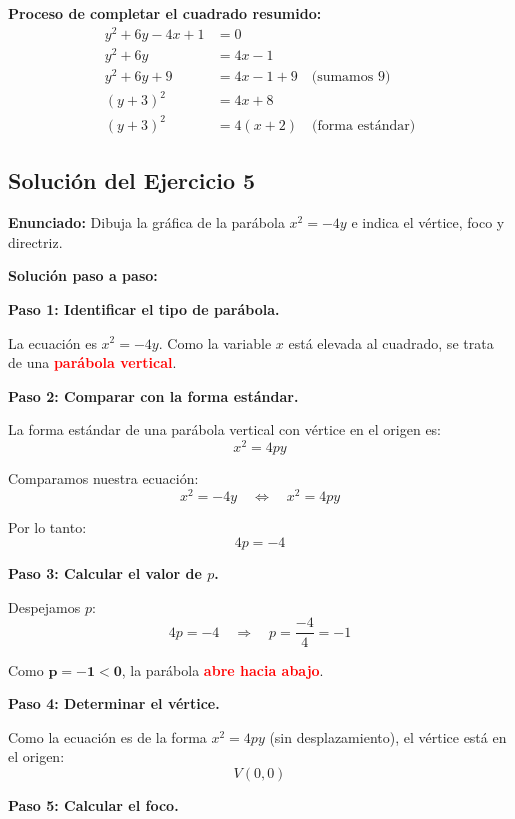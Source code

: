 \documentclass[12pt,a4paper]{article}
\begin{document}
	\bigskip

	\textbf{Proceso de completar el cuadrado resumido:}
	\[
	\begin{aligned}
		y^2+6y-4x+1&=0 \\
		y^2+6y&=4x-1 \\
		y^2+6y+9&=4x-1+9 \quad\text{(sumamos 9)} \\
		(y+3)^2&=4x+8 \\
		(y+3)^2&=4(x+2) \quad\text{(forma estándar)}
	\end{aligned}
	\]


	\subsection*{Solución del Ejercicio 5}

	\textbf{Enunciado:} Dibuja la gráfica de la parábola \(x^2=-4y\) e indica el vértice, foco y directriz.

	\bigskip

	\textbf{Solución paso a paso:}

	\bigskip

	\textbf{Paso 1: Identificar el tipo de parábola.}

	La ecuación es \(x^2=-4y\). Como la variable \(x\) está elevada al cuadrado, se trata de una \textcolor{red}{\textbf{parábola vertical}}.

	\bigskip

	\textbf{Paso 2: Comparar con la forma estándar.}

	La forma estándar de una parábola vertical con vértice en el origen es:
	\[
	x^2=4py
	\]

	Comparamos nuestra ecuación:
	\[
	x^2=-4y \quad\Leftrightarrow\quad x^2=4py
	\]

	Por lo tanto:
	\[
	4p=-4
	\]

	\textbf{Paso 3: Calcular el valor de \(p\).}

	Despejamos \(p\):
	\[
	4p=-4 \quad\Rightarrow\quad p=\frac{-4}{4}=-1
	\]

	Como \(\mathbf{p=-1<0}\), la parábola \textcolor{red}{\textbf{abre hacia abajo}}.

	\bigskip

	\textbf{Paso 4: Determinar el vértice.}

	Como la ecuación es de la forma \(x^2=4py\) (sin desplazamiento), el vértice está en el origen:
	\[
	\boxed{V(0,0)}
	\]

	\textbf{Paso 5: Calcular el foco.}
\end{document}

